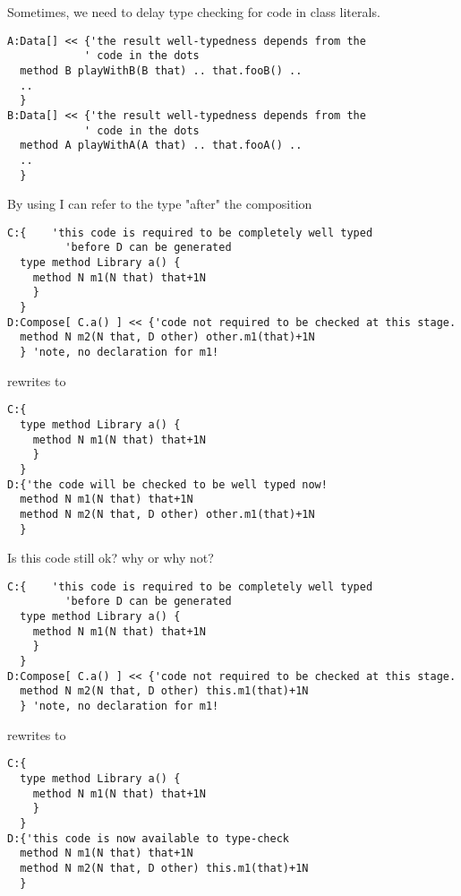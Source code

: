 \begin{frame}[fragile]
Sometimes, we need to delay type checking for code in class literals.
\begin{NiceCode}{59ex}{0.8}
\begin{lstlisting}
A:Data[] << {'the result well-typedness depends from the
            ' code in the dots
  method B playWithB(B that) .. that.fooB() .. 
  ..
  }         
B:Data[] << {'the result well-typedness depends from the
            ' code in the dots
  method A playWithA(A that) .. that.fooA() ..  
  ..
  }         
\end{lstlisting}
\end{NiceCode}
\end{frame}

\begin{frame}[fragile]
By using \Q@D@ I can refer to the type "after" the composition
\begin{NiceCode}{59ex}{0.8}
\begin{lstlisting}
C:{    'this code is required to be completely well typed 
         'before D can be generated
  type method Library a() {
    method N m1(N that) that+1N
    }
  }
D:Compose[ C.a() ] << {'code not required to be checked at this stage.
  method N m2(N that, D other) other.m1(that)+1N
  } 'note, no declaration for m1!
\end{lstlisting}
\end{NiceCode}
rewrites to 

\begin{NiceCode}{59ex}{0.8}
\begin{lstlisting}
C:{
  type method Library a() {
    method N m1(N that) that+1N
    }
  }
D:{'the code will be checked to be well typed now!
  method N m1(N that) that+1N
  method N m2(N that, D other) other.m1(that)+1N
  }   
\end{lstlisting}
\end{NiceCode}
\end{frame}


\begin{frame}[fragile]
Is this code still ok? why or why not?
\begin{NiceCode}{59ex}{0.8}
\begin{lstlisting}
C:{    'this code is required to be completely well typed 
         'before D can be generated
  type method Library a() {
    method N m1(N that) that+1N
    }
  }
D:Compose[ C.a() ] << {'code not required to be checked at this stage.
  method N m2(N that, D other) this.m1(that)+1N
  } 'note, no declaration for m1!
\end{lstlisting}
\end{NiceCode}
rewrites to 

\begin{NiceCode}{59ex}{0.8}
\begin{lstlisting}
C:{
  type method Library a() {
    method N m1(N that) that+1N
    }
  }
D:{'this code is now available to type-check
  method N m1(N that) that+1N
  method N m2(N that, D other) this.m1(that)+1N
  }   
\end{lstlisting}
\end{NiceCode}
\end{frame}


